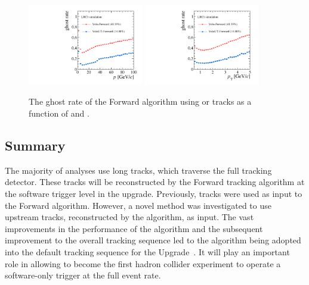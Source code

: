 \begin{figure}[!tb]
\centering
\includegraphics[width=0.45\textwidth]{figs/upstream-tracking-upgrade/fwd_gr_p_comp.pdf}
\includegraphics[width=0.45\textwidth]{figs/upstream-tracking-upgrade/fwd_gr_pt_comp.pdf}
\caption{The ghost rate of the Forward algorithm using \velo or \velout tracks as a function of \ptot and \pt.}
\label{fig:gr_fwd_comp}
\end{figure}

\subsection{Summary}

The majority of \lhcb analyses use long tracks, which traverse the full tracking detector. These tracks will be reconstructed by the Forward tracking algorithm at the software trigger level in the \lhcb upgrade. Previously, \velo tracks were used as input to the Forward algorithm. However, a novel method was investigated to use upstream tracks, reconstructed by the \velout algorithm, as input. The vast improvements in the performance of the \velout algorithm and the subsequent improvement to the overall tracking sequence led to the algorithm being adopted into the default tracking sequence for the \lhcb Upgrade~\cite{LHCb-TDR-016,LHCb-TDR-015}. It will play an important role in allowing \lhcb to become the first hadron collider experiment to operate a software-only trigger at the full event rate.

